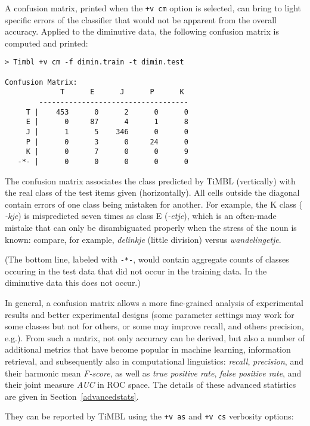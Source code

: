 \documentclass{report}
\begin{document}
A confusion matrix, printed when the {\tt +v cm} option is selected,
can bring to light specific errors of the classifier that would not be
apparent from the overall accuracy. Applied to the diminutive data,
the following confusion matrix is computed and printed:

{\footnotesize
\begin{verbatim}
> Timbl +v cm -f dimin.train -t dimin.test

Confusion Matrix:
             T      E      J      P      K 
        -----------------------------------
     T |    453      0      2      0      0 
     E |      0     87      4      1      8 
     J |      1      5    346      0      0 
     P |      0      3      0     24      0 
     K |      0      7      0      0      9 
   -*- |      0      0      0      0      0 
\end{verbatim}
}

The confusion matrix associates the class predicted by TiMBL
(vertically) with the real class of the test items given
(horizontally). All cells outside the diagonal contain errors of one
class being mistaken for another. For example, the K class ({\em
  -kje}) is mispredicted seven times as class E ({\em -etje}), which
is an often-made mistake that can only be disambiguated properly when
the stress of the noun is known: compare, for example, {\em delinkje}\/
(little division) versus {\em wandelingetje}.

(The bottom line, labeled with {\tt -*-}, would contain aggregate
counts of classes occuring in the test data that did not occur in the
training data. In the diminutive data this does not occur.)

In general, a confusion matrix allows a more fine-grained analysis of
experimental results and better experimental designs (some parameter
settings may work for some classes but not for others, or some may
improve recall, and others precision, e.g.). From such a matrix, not
only accuracy can be derived, but also a number of additional metrics
that have become popular in machine learning, information retrieval,
and subsequently also in computational linguistics: {\em recall},
{\em precision}, and their harmonic mean {\em F-score}, as well as {\em true
  positive rate}, {\em false positive rate}, and their joint measure
{\em AUC} in ROC space.  The details of these advanced statistics are
given in Section~\ref{advancedstats}.

They can be reported by TiMBL using the {\tt +v as} and {\tt +v cs}
verbosity options:
\end{document}

